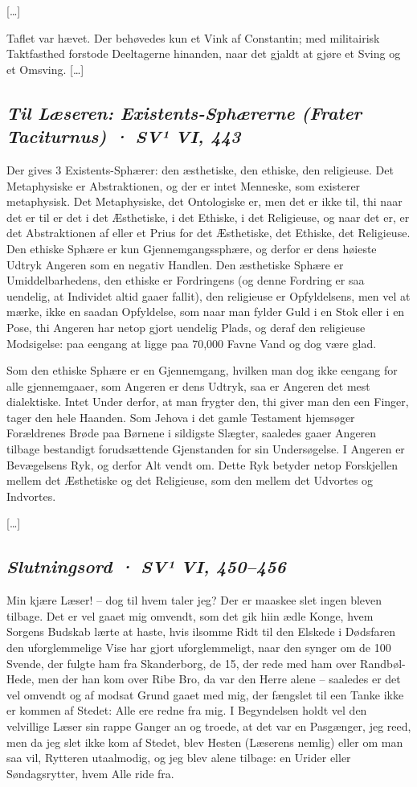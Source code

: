 \documentclass[12pt,a4paper]{article}
\newcommand{\sectionheading}[1]{\subsection*{\normalfont\itshape #1}}
\begin{document}
[…]

Taflet var hævet. Der behøvedes kun et Vink af Constantin; med militairisk Taktfasthed forstode Deeltagerne hinanden, naar det gjaldt at gjøre et Sving og et Omsving. […]

\sectionheading{Til Læseren: Existents-Sphærerne (Frater Taciturnus)  ·  SV¹ VI, 443}

Der gives 3 Existents-Sphærer: den æsthetiske, den ethiske, den religieuse. Det Metaphysiske er Abstraktionen, og der er intet Menneske, som existerer metaphysisk. Det Metaphysiske, det Ontologiske er, men det er ikke til, thi naar det er til er det i det Æsthetiske, i det Ethiske, i det Religieuse, og naar det er, er det Abstraktionen af eller et Prius for det Æsthetiske, det Ethiske, det Religieuse. Den ethiske Sphære er kun Gjennemgangssphære, og derfor er dens høieste Udtryk Angeren som en negativ Handlen. Den æsthetiske Sphære er Umiddelbarhedens, den ethiske er Fordringens (og denne Fordring er saa uendelig, at Individet altid gaaer fallit), den religieuse er Opfyldelsens, men vel at mærke, ikke en saadan Opfyldelse, som naar man fylder Guld i en Stok eller i en Pose, thi Angeren har netop gjort uendelig Plads, og deraf den religieuse Modsigelse: paa eengang at ligge paa 70,000 Favne Vand og dog være glad.

Som den ethiske Sphære er en Gjennemgang, hvilken man dog ikke eengang for alle gjennemgaaer, som Angeren er dens Udtryk, saa er Angeren det mest dialektiske. Intet Under derfor, at man frygter den, thi giver man den een Finger, tager den hele Haanden. Som Jehova i det gamle Testament hjemsøger Forældrenes Brøde paa Børnene i sildigste Slægter, saaledes gaaer Angeren tilbage bestandigt forudsættende Gjenstanden for sin Undersøgelse. I Angeren er Bevægelsens Ryk, og derfor Alt vendt om. Dette Ryk betyder netop Forskjellen mellem det Æsthetiske og det Religieuse, som den mellem det Udvortes og Indvortes.

[…]

\sectionheading{Slutningsord  ·  SV¹ VI, 450–456}

Min kjære Læser! – dog til hvem taler jeg? Der er maaskee slet ingen bleven tilbage. Det er vel gaaet mig omvendt, som det gik hiin ædle Konge, hvem Sorgens Budskab lærte at haste, hvis ilsomme Ridt til den Elskede i Dødsfaren den uforglemmelige Vise har gjort uforglemmeligt, naar den synger om de 100 Svende, der fulgte ham fra Skanderborg, de 15, der rede med ham over Randbøl-Hede, men der han kom over Ribe Bro, da var den Herre alene – saaledes er det vel omvendt og af modsat Grund gaaet med mig, der fængslet til een Tanke ikke er kommen af Stedet: Alle ere redne fra mig. I Begyndelsen holdt vel den velvillige Læser sin rappe Ganger an og troede, at det var en Pasgænger, jeg reed, men da jeg slet ikke kom af Stedet, blev Hesten (Læserens nemlig) eller om man saa vil, Rytteren utaalmodig, og jeg blev alene tilbage: en Urider eller Søndagsrytter, hvem Alle ride fra.
\end{document}
